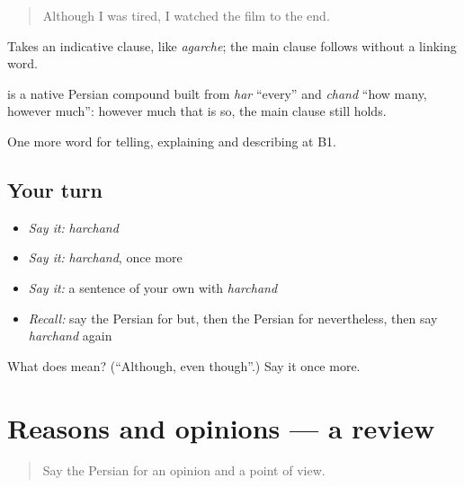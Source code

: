 \begin{quote}
Although I was tired, I watched the film to the end.
\end{quote}

Takes an indicative clause, like \emph{agarche}; the main clause follows without a linking word.

\begin{cousinweb}
\textbf{} is a native Persian compound built from \emph{har} \textquotedblleft{}every\textquotedblright{} and \emph{chand} \textquotedblleft{}how many, however much\textquotedblright{}: however much that is so, the main clause still holds.
\end{cousinweb}

\begin{grammarlens}[title={What you've built}]
One more word for telling, explaining and describing at B1.
\end{grammarlens}

\subsection*{Your turn}
\begin{itemize}
\raggedright
  \item \emph{Say it:} \emph{harchand}
  \item \emph{Say it:} \emph{harchand}, once more
  \item \emph{Say it:} a sentence of your own with \emph{harchand}
  \item \emph{Recall:} say the Persian for but, then the Persian for nevertheless, then say \emph{harchand} again
\end{itemize}

\begin{tcolorbox}[breakable,colback=teal!4,colframe=teal!35!black,title={Before you move on}]
What does  mean? (\textquotedblleft{}Although, even though\textquotedblright{}.) Say it once more.
\end{tcolorbox}
\section[(dialogue)]{Reasons and opinions — a review}

\label{lesson:FA-R367-review-360-367}



\begin{quote}
Say the Persian for an opinion and a point of view.
\end{quote}

